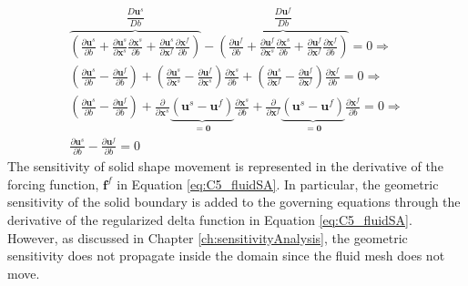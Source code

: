 \begin{gather*}
	\overbrace{	
	\left(
	\frac{\partial \mathbf{u}^s}{\partial b} +
	\frac{\partial \mathbf{u}^s}{\partial \mathbf{x}^s} \frac{\partial \mathbf{x}^s}{\partial b} +
	\frac{\partial \mathbf{u}^s}{\partial \mathbf{x}^f} \frac{\partial \mathbf{x}^f}{\partial b}
	\right)
	}^{\dfrac{D \mathbf{u}^s}{D b}} -
	\overbrace{
	\left(
	\frac{\partial \mathbf{u}^f}{\partial b} +
	\frac{\partial \mathbf{u}^f}{\partial \mathbf{x}^s} \frac{\partial \mathbf{x}^s}{\partial b} +
	\frac{\partial \mathbf{u}^f}{\partial \mathbf{x}^f} \frac{\partial \mathbf{x}^f}{\partial b}
	\right)
	}^{\dfrac{D \mathbf{u}^f}{D b}} = 0 \Longrightarrow
	\\
	\left(
	\frac{\partial \mathbf{u}^s}{\partial b} - \frac{\partial \mathbf{u}^f}{\partial b}
	\right) +
	\left(
	\frac{\partial \mathbf{u}^s}{\partial \mathbf{x}^s} - 
	\frac{\partial \mathbf{u}^f}{\partial \mathbf{x}^s}
	\right) \frac{\partial \mathbf{x}^s}{\partial b} +
	\left(
	\frac{\partial \mathbf{u}^s}{\partial \mathbf{x}^f} - 
	\frac{\partial \mathbf{u}^f}{\partial \mathbf{x}^f}
	\right) \frac{\partial \mathbf{x}^f}{\partial b} = 
	0 \Longrightarrow
	\\
	\left(
	\frac{\partial \mathbf{u}^s}{\partial b} - \frac{\partial \mathbf{u}^f}{\partial b}
	\right) +
	\frac{\partial }{\partial \mathbf{x}^s}
	\underbrace{	
	\left(
	\mathbf{u}^s - \mathbf{u}^f
	\right)
	}_{=\mathbf{0}} \frac{\partial \mathbf{x}^s}{\partial b} +
	\frac{\partial }{\partial \mathbf{x}^f}
	\underbrace{	
	\left(
	\mathbf{u}^s - \mathbf{u}^f
	\right)
	}_{=\mathbf{0}} \frac{\partial \mathbf{x}^f}{\partial b} = 
	0 \Longrightarrow
	\\
	\frac{\partial \mathbf{u}^s}{\partial b} - 
	\frac{\partial \mathbf{u}^f}{\partial b} = 0
\end{gather*}
%
The sensitivity of solid shape movement is represented in the derivative of the forcing function, $\mathbf{f}^f$ in Equation \eqref{eq:C5_fluidSA}. In particular, the geometric sensitivity of the solid boundary is added to the governing equations through the derivative of the regularized delta function in Equation \eqref{eq:C5_fluidSA}. However, as discussed in Chapter \ref{ch:sensitivityAnalysis}, the geometric sensitivity does not propagate inside the domain since the fluid mesh does not move.

